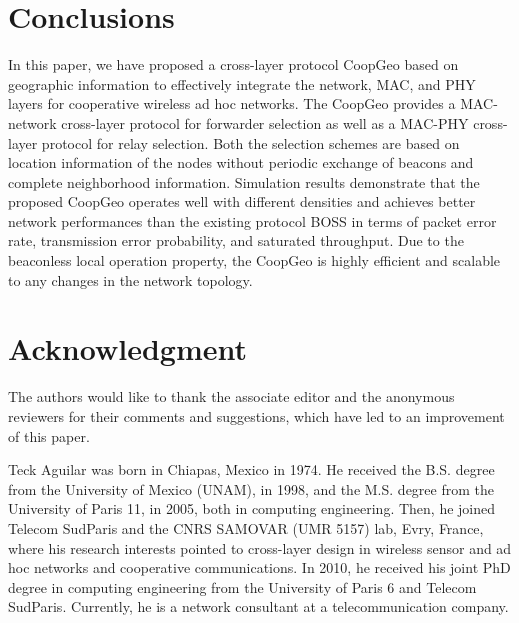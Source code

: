 \documentclass[journal,twoside,final]{IEEEtran}
\begin{document}
\section{Conclusions}
In this paper, we have proposed a cross-layer protocol CoopGeo based on geographic information to effectively integrate the network, MAC, and PHY layers for cooperative wireless ad hoc networks. The CoopGeo provides a MAC-network cross-layer protocol for forwarder selection as well as a MAC-PHY cross-layer protocol for relay selection. Both the selection schemes are based on location information of the nodes without periodic exchange of beacons and complete neighborhood information. Simulation results demonstrate that the proposed CoopGeo operates well with different densities and achieves better network performances than the existing protocol BOSS in terms of packet error rate, transmission error probability, and saturated throughput. Due to the beaconless local operation property, the CoopGeo is highly efficient and scalable to any changes in the network topology.
\section*{Acknowledgment}
The authors would like to thank the associate editor and the anonymous reviewers for their comments and suggestions, which have led to an improvement of this paper.

\begin{comment}
\appendices
\section{Proof of forwarding contention Equation}
Appendix one text goes here.
\section{}
Appendix two text goes here.
\section*{Acknowledgment}
The authors would like to thank the anonymous reviewers for their suggestions which have led to an improvement of this paper.
\end{comment}




\vfill
\begin{IEEEbiography}{Teck Aguilar}
was born in Chiapas, Mexico in 1974. He received the B.S. degree from the University of Mexico (UNAM), in 1998,
and the M.S. degree from the University of Paris 11, in 2005, both in computing engineering. Then, he joined Telecom
SudParis and the CNRS SAMOVAR (UMR 5157) lab, Evry, France, where his research interests pointed to cross-layer design in wireless sensor and ad hoc networks and cooperative communications. In 2010, he received his joint PhD degree in computing engineering from the University of Paris 6 and Telecom SudParis. Currently, he is a network consultant at a telecommunication company.
\end{IEEEbiography}
\end{document}
